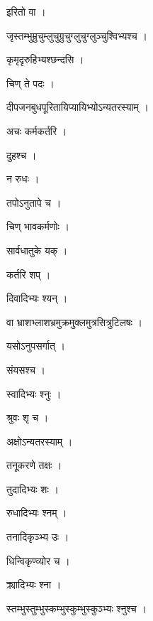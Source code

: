 \documentclass[10pt, openany]{book}
\begin{document}
\noindent इरितो वा ।

\noindent जृस्तम्भुम्रुचुम्लुचुग्रुचुग्लुचुग्लुञ्चुश्विभ्यश्च ।

\noindent कृमृदृरुहिभ्यश्छन्दसि ।

\noindent चिण् ते पदः ।

\noindent दीपजनबुधपूरितायिप्यायिभ्योऽन्यतरस्याम् ।

\noindent अचः कर्मकर्तरि ।

\noindent दुहश्च ।

\noindent न रुधः ।

\noindent तपोऽनुतापे च ।

\noindent चिण् भावकर्मणोः ।

\noindent सार्वधातुके यक् ।

\noindent कर्तरि शप् ।

\noindent दिवादिभ्यः श्यन् ।

\noindent वा भ्राशभ्लाशभ्रमुक्रमुक्लमुत्रसित्रुटिलषः ।

\noindent यसोऽनुपसर्गात् ।

\noindent संयसश्च ।

\noindent स्वादिभ्यः श्नुः ।

\noindent श्रुवः श‍ृ च ।

\noindent अक्षोऽन्यतरस्याम् ।

\noindent तनूकरणे तक्षः ।

\noindent तुदादिभ्यः शः ।

\noindent रुधादिभ्यः श्नम् ।

\noindent तनादिकृञ्भ्य उः ।

\noindent धिन्विकृण्व्योर च ।

\noindent क्र्यादिभ्यः श्ना ।

\noindent स्तम्भुस्तुम्भुस्कम्भुस्कुम्भुस्कुञ्भ्यः श्नुश्च ।
\end{document}

